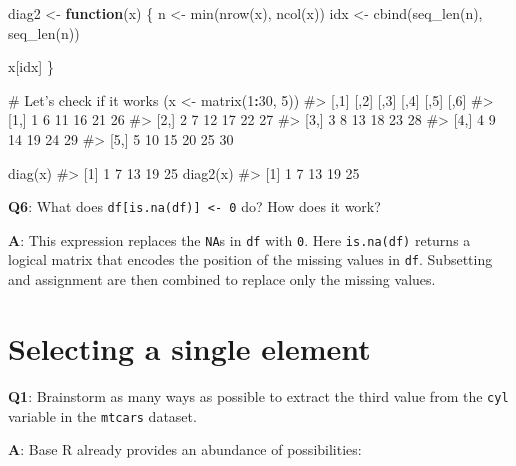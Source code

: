 \documentclass[
]{krantz}
\makeatletter
\newenvironment{Shaded}{\begin{snugshade}}{\end{snugshade}}
\newcommand{\CommentTok}[1]{\textcolor[rgb]{0.56,0.35,0.01}{\textit{#1}}}
\newcommand{\ControlFlowTok}[1]{\textcolor[rgb]{0.13,0.29,0.53}{\textbf{#1}}}
\newcommand{\DecValTok}[1]{\textcolor[rgb]{0.00,0.00,0.81}{#1}}
\newcommand{\KeywordTok}[1]{\textcolor[rgb]{0.13,0.29,0.53}{\textbf{#1}}}
\newcommand{\NormalTok}[1]{#1}
\newcommand{\OperatorTok}[1]{\textcolor[rgb]{0.81,0.36,0.00}{\textbf{#1}}}
\newcommand{\StringTok}[1]{\textcolor[rgb]{0.31,0.60,0.02}{#1}}
\newenvironment{kframe}{%
\medskip{}
\setlength{\fboxsep}{.8em}
 \def\at@end@of@kframe{}%
 \ifinner\ifhmode%
  \def\at@end@of@kframe{\end{minipage}}%
  \begin{minipage}{\columnwidth}%
 \fi\fi%
 \def\FrameCommand##1{\hskip\@totalleftmargin \hskip-\fboxsep
 \colorbox{shadecolor}{##1}\hskip-\fboxsep
     \hskip-\linewidth \hskip-\@totalleftmargin \hskip\columnwidth}%
 \MakeFramed {\advance\hsize-\width
   \@totalleftmargin\z@ \linewidth\hsize
   \@setminipage}}%
 {\par\unskip\endMakeFramed%
 \at@end@of@kframe}
\renewenvironment{Shaded}{\begin{kframe}}{\end{kframe}}
\renewcommand{\KeywordTok} [1]{\textcolor[rgb]{0.00,0.44,0.13}{{#1}}}
\renewcommand{\DecValTok}  [1]{\textcolor[rgb]{0.25,0.63,0.44}{{#1}}}
\renewcommand{\StringTok}  [1]{\textcolor[rgb]{0.25,0.44,0.63}{{#1}}}
\renewcommand{\CommentTok} [1]{\textcolor[rgb]{0.38,0.63,0.69}{{#1}}}
\renewcommand{\NormalTok}  [1]{{#1}}
\makeatother
\begin{document}
\begin{Shaded}
\begin{Highlighting}[]
\NormalTok{diag2 <-}\StringTok{ }\ControlFlowTok{function}\NormalTok{(x) \{}
\NormalTok{  n <-}\StringTok{ }\KeywordTok{min}\NormalTok{(}\KeywordTok{nrow}\NormalTok{(x), }\KeywordTok{ncol}\NormalTok{(x))}
\NormalTok{  idx <-}\StringTok{ }\KeywordTok{cbind}\NormalTok{(}\KeywordTok{seq_len}\NormalTok{(n), }\KeywordTok{seq_len}\NormalTok{(n))}

\NormalTok{  x[idx]}
\NormalTok{\}}

\CommentTok{# Let's check if it works}
\NormalTok{(x <-}\StringTok{ }\KeywordTok{matrix}\NormalTok{(}\DecValTok{1}\OperatorTok{:}\DecValTok{30}\NormalTok{, }\DecValTok{5}\NormalTok{))}
\CommentTok{#>      [,1] [,2] [,3] [,4] [,5] [,6]}
\CommentTok{#> [1,]    1    6   11   16   21   26}
\CommentTok{#> [2,]    2    7   12   17   22   27}
\CommentTok{#> [3,]    3    8   13   18   23   28}
\CommentTok{#> [4,]    4    9   14   19   24   29}
\CommentTok{#> [5,]    5   10   15   20   25   30}

\KeywordTok{diag}\NormalTok{(x)}
\CommentTok{#> [1]  1  7 13 19 25}
\KeywordTok{diag2}\NormalTok{(x)}
\CommentTok{#> [1]  1  7 13 19 25}
\end{Highlighting}
\end{Shaded}

\textbf{{Q6}}: What does \texttt{df{[}is.na(df){]}\ \textless{}-\ 0} do? How does it work?

\textbf{{A}}: This expression replaces the \texttt{NA}s in \texttt{df} with \texttt{0}. Here \texttt{is.na(df)} returns a logical matrix that encodes the position of the missing values in \texttt{df}. Subsetting and assignment are then combined to replace only the missing values.

\hypertarget{selecting-a-single-element}{%
\section{Selecting a single element}\label{selecting-a-single-element}}

\textbf{{Q1}}: Brainstorm as many ways as possible to extract the third value from the \texttt{cyl} variable in the \texttt{mtcars} dataset.

\textbf{{A}}: Base R already provides an abundance of possibilities:
\end{document}
